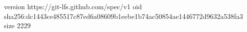 version https://git-lfs.github.com/spec/v1
oid sha256:dc1443ce485517c87ed6a08609b1eebe1b74ac50854ae1446772d9632a538fa3
size 2229
